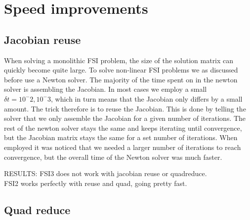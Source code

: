\chapter{Speed improvements}
\section{Jacobian reuse}
When solving a monolithic FSI problem, the size of the solution matrix can quickly become quite large. To solve non-linear FSI problems we as discussed before use a Newton solver. The majority of the time spent on in the newton solver is assembling the Jacobian. In most cases we employ a small $\delta t = 10^-2, 10^-3$, which in turn means that the Jacobian only differs by a small amount. The trick therefore is to reuse the Jacobian. This is done by telling the solver that we only assemble the Jacobian for a given number of iterations. The rest of the newton solver stays the same and keeps iterating until convergence, but the Jacobian matrix stays the same for a set number of iterations. When employed it was noticed that we needed a larger number of iterations to reach convergence, but the overall time of the Newton solver was much faster.

RESULTS:
FSI3 does not work with jacobian reuse or quadreduce. \\
FSI2 works perfectly with reuse and quad, going pretty fast.

\section{Quad reduce}
